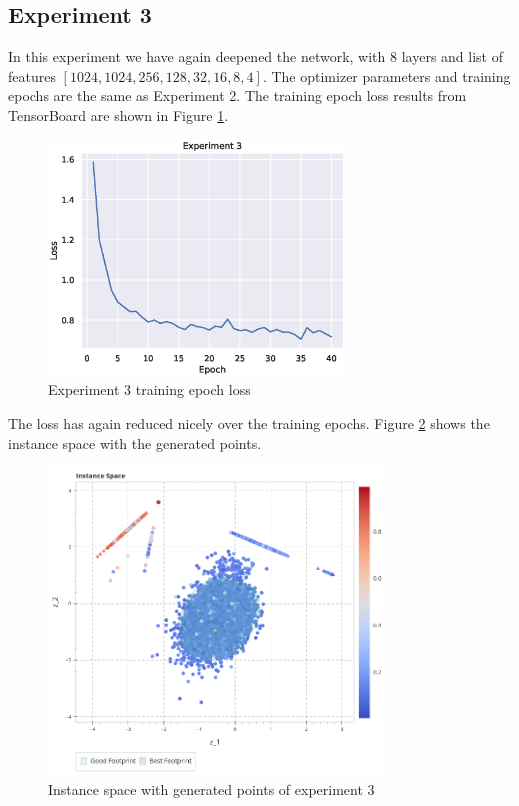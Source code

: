 \subsection{Experiment 3}

In this experiment we have again deepened the network, with 8 layers and list of features $[1024, 1024, 256, 128, 32, 16, 8, 4]$. The optimizer parameters and training epochs are the same as Experiment 2. The training epoch loss results from TensorBoard are shown in Figure \ref{fig:exp3}.

\begin{figure}[H]
    \centering
    \includegraphics[width=0.7\textwidth]{Cap5/loss_exp3}
    \caption{Experiment 3 training epoch loss}
    \label{fig:exp3}
\end{figure}

The loss has again reduced nicely over the training epochs. Figure \ref{fig:is_gen_points3} shows the instance space with the generated points.

\begin{figure}[H]
    \centering
    \includegraphics[width=0.8\textwidth]{Cap5/is_exp3}
    \caption{Instance space with generated points of experiment 3}
    \label{fig:is_gen_points3}
\end{figure}


